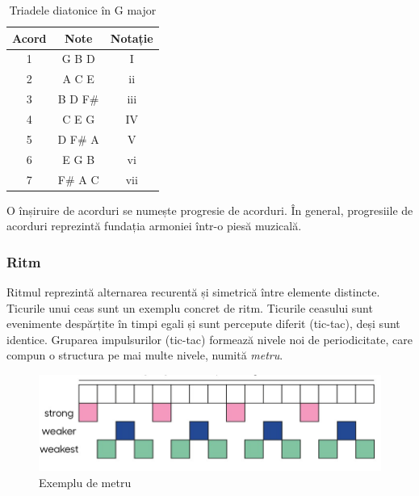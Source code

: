 \begin{table}[H]
    \begin{center}

    \begin{tabular}{ c c c }
        \hline
        Acord & Note & Notație \\
        \hline
        1 & G B D & I \\
        2 & A C E & ii \\
        3 & B D F\# & iii \\
        4 & C E G & IV \\
        5 & D F\# A & V \\
        6 & E G B & vi \\
        7 & F\# A C & vii \\
        \hline
    \end{tabular}
    \caption{Triadele diatonice în G major}
    \end{center}
\end{table}

\noindent O înșiruire de acorduri se numește progresie de acorduri. În general, progresiile de acorduri reprezintă fundația armoniei într-o piesă muzicală.

\subsubsection{Ritm}

\noindent Ritmul reprezintă alternarea recurentă și simetrică între elemente distincte. Ticurile unui ceas sunt un exemplu concret de ritm. Ticurile ceasului sunt evenimente despărțite în timpi egali și sunt percepute diferit (tic-tac), deși sunt identice. Gruparea impulsurilor (tic-tac) formează nivele noi de periodicitate, care compun o structura pe mai multe nivele, numită \textit{metru}. 

\begin{figure}[H]
    \centering
    \includegraphics[scale=1.8]{images/rhythm.jpeg}
    \caption{Exemplu de metru}
    \label{image.rhythm}
\end{figure}

